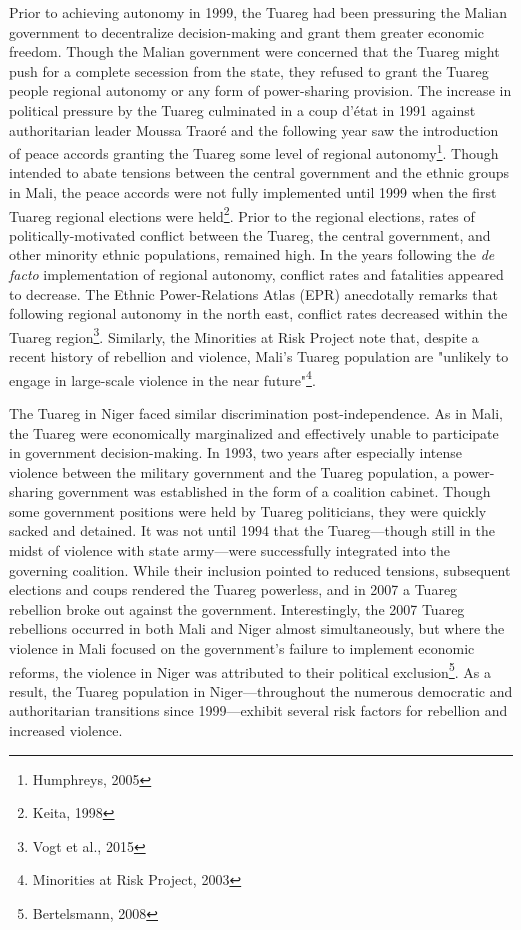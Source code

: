 \documentclass[12pt]{article}
\begin{document}
Prior to achieving autonomy in 1999, the Tuareg had been pressuring the Malian government to decentralize decision-making and grant them greater economic freedom. Though the Malian government were concerned that the Tuareg might push for a complete secession from the state, they refused to grant the Tuareg people regional autonomy or any form of power-sharing provision. The increase in political pressure by the Tuareg culminated in a coup d’état in 1991 against authoritarian leader Moussa Traoré and the following year saw the introduction of peace accords granting the Tuareg some level of regional autonomy\footnote{Humphreys, 2005}. Though intended to abate tensions between the central government and the ethnic groups in Mali, the peace accords were not fully implemented until 1999 when the first Tuareg regional elections were held\footnote{Keita, 1998}. Prior to the regional elections, rates of politically-motivated conflict between the Tuareg, the central government, and other minority ethnic populations, remained high. In the years following the \textit{de facto} implementation of regional autonomy, conflict rates and fatalities appeared to decrease. The Ethnic Power-Relations Atlas (EPR) anecdotally remarks that following regional autonomy in the north east, conflict rates decreased within the Tuareg region\footnote{Vogt et al., 2015}. Similarly, the Minorities at Risk Project note that, despite a recent history of rebellion and violence, Mali's Tuareg population are "unlikely to engage in large-scale violence in the near future"\footnote{Minorities at Risk Project, 2003}. 

The Tuareg in Niger faced similar discrimination post-independence. As in Mali, the Tuareg were economically marginalized and effectively unable to participate in government decision-making. In 1993, two years after especially intense violence between the military government and the Tuareg population, a power-sharing government was established in the form of a coalition cabinet. Though some government positions were held by Tuareg politicians, they were quickly sacked and detained. It was not until 1994 that the Tuareg---though still in the midst of violence with state army---were successfully integrated into the governing coalition. While their inclusion pointed to reduced tensions, subsequent elections and coups rendered the Tuareg powerless, and in 2007 a Tuareg rebellion broke out against the government. Interestingly, the 2007 Tuareg rebellions occurred in both Mali and Niger almost simultaneously, but where the violence in Mali focused on the government's failure to implement economic reforms, the violence in Niger was attributed to their political exclusion\footnote{Bertelsmann, 2008}. As a result, the Tuareg population in Niger---throughout the numerous democratic and authoritarian transitions since 1999---exhibit several risk factors for rebellion and increased violence.
\end{document}
